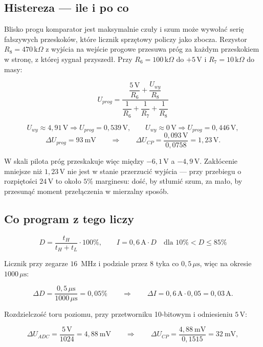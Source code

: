 \documentclass[a4paper,11pt]{article}
\newcommand{\kohm}{\,\mathrm{k}\Omega}
\newcommand{\volt}{\,\mathrm{V}}
\newcommand{\amp}{\,\mathrm{A}}
\newcommand{\us}{\,\mu\mathrm{s}}
\begin{document}
\subsection{Histereza --- ile i po co}

Blisko progu komparator jest maksymalnie czuły i szum może wywołać serię fałszywych
przeskoków, które licznik sprzętowy policzy jako zbocza. Rezystor $R_8=470\kohm$
z wyjścia na wejście progowe przesuwa próg za każdym przeskokiem w stronę, z której
sygnał przyszedł. Przy $R_6=100\kohm$ do $+5\volt$ i $R_7=10\kohm$ do masy:

\begin{equation}
U_{prog}=\frac{\dfrac{5\volt}{R_6}+\dfrac{U_{wy}}{R_8}}
              {\dfrac{1}{R_6}+\dfrac{1}{R_7}+\dfrac{1}{R_8}}
\label{eq:histereza}
\end{equation}

\[
U_{wy}\approx 4{,}91\volt \Rightarrow U_{prog}=0{,}539\volt,
\qquad
U_{wy}\approx 0\volt \Rightarrow U_{prog}=0{,}446\volt,
\]
\[
\Delta U_{prog}=93\ \mathrm{mV}
\qquad\Longrightarrow\qquad
\Delta U_{CP}=\frac{0{,}093\volt}{0{,}0758}=1{,}23\volt .
\]

W skali pilota próg przeskakuje więc między $-6{,}1\volt$ a $-4{,}9\volt$.
Zakłócenie mniejsze niż $1{,}23\volt$ nie jest w stanie przerzucić wyjścia --- przy
przebiegu o rozpiętości $24\volt$ to około $5\%$ marginesu: dość, by stłumić szum,
za mało, by przesunąć moment przełączenia w mierzalny sposób.

\subsection{Co program z tego liczy}

\begin{equation}
D=\frac{t_H}{t_H+t_L}\cdot100\%,
\qquad
I = 0{,}6\amp\cdot D \quad\text{dla } 10\% < D \le 85\%
\end{equation}

Licznik przy zegarze $16$~MHz i podziale przez $8$ tyka co $0{,}5\us$, więc na
okresie $1000\us$:

\[
\Delta D=\frac{0{,}5\us}{1000\us}=0{,}05\%
\qquad\Longrightarrow\qquad
\Delta I = 0{,}6\amp\cdot0{,}05=0{,}03\amp .
\]

Rozdzielczość toru poziomu, przy przetworniku 10-bitowym i odniesieniu $5\volt$:

\[
\Delta U_{ADC}=\frac{5\volt}{1024}=4{,}88\ \mathrm{mV}
\qquad\Longrightarrow\qquad
\Delta U_{CP}=\frac{4{,}88\ \mathrm{mV}}{0{,}1515}=32\ \mathrm{mV},
\]
\end{document}

